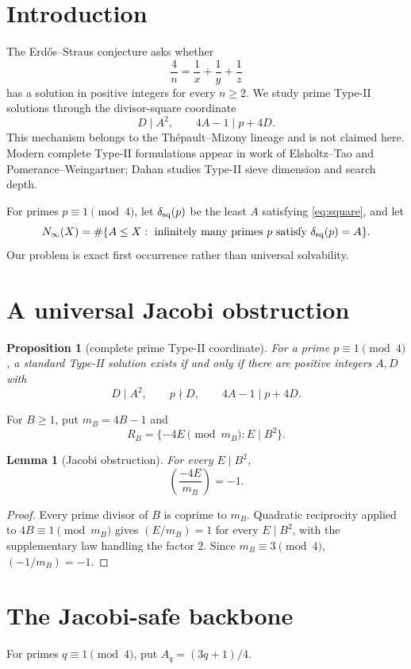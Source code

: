 \documentclass[11pt]{article}
\newtheorem{lemma}[theorem]{Lemma}
\newtheorem{proposition}[theorem]{Proposition}
\theoremstyle{definition}
\newcommand{\sqdepth}{\delta_{\rm sq}}
\begin{document}
\section{Introduction}
The Erd\H{o}s--Straus conjecture asks whether
\[
\frac4n=\frac1x+\frac1y+\frac1z
\]
has a solution in positive integers for every $n\ge2$. We study prime Type-II solutions through the divisor-square coordinate
\begin{equation}\label{eq:square}
D\mid A^2,\qquad 4A-1\mid p+4D.
\end{equation}
This mechanism belongs to the Th\'epault--Mizony lineage and is not claimed here. Modern complete Type-II formulations appear in work of Elsholtz--Tao and Pomerance--Weingartner; Dahan studies Type-II sieve dimension and search depth.

For primes $p\equiv1\pmod4$, let $\sqdepth(p)$ be the least $A$ satisfying \eqref{eq:square}, and let
\[
N_\infty(X)=\#\{A\le X:\text{ infinitely many primes }p\text{ satisfy }\sqdepth(p)=A\}.
\]
Our problem is exact first occurrence rather than universal solvability.

\section{A universal Jacobi obstruction}
\begin{proposition}[complete prime Type-II coordinate]\label{prop:complete}
For a prime $p\equiv1\pmod4$, a standard Type-II solution exists if and only if there are positive integers $A,D$ with
\[
D\mid A^2,\qquad p\nmid D,\qquad 4A-1\mid p+4D.
\]
\end{proposition}

For $B\ge1$, put $m_B=4B-1$ and
\[
R_B=\{-4E\pmod{m_B}:E\mid B^2\}.
\]

\begin{lemma}[Jacobi obstruction]\label{lem:jacobi}
For every $E\mid B^2$,
\[
\boxed{\left(\frac{-4E}{m_B}\right)=-1.}
\]
\end{lemma}

\begin{proof}
Every prime divisor of $B$ is coprime to $m_B$. Quadratic reciprocity applied to $4B\equiv1\pmod{m_B}$ gives $(E/m_B)=1$ for every $E\mid B^2$, with the supplementary law handling the factor $2$. Since $m_B\equiv3\pmod4$, $(-1/m_B)=-1$.
\end{proof}

\section{The Jacobi-safe backbone}
For primes $q\equiv1\pmod4$, put $A_q=(3q+1)/4$.
\end{document}
